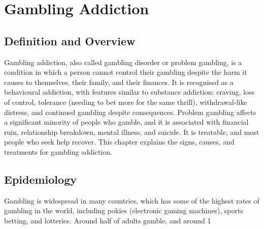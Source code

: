 \chapter{Gambling Addiction}

\section*{Definition and Overview}
Gambling addiction, also called gambling disorder or problem gambling, is a condition in which a person cannot control their gambling despite the harm it causes to themselves, their family, and their finances. It is recognised as a behavioural addiction, with features similar to substance addiction: craving, loss of control, tolerance (needing to bet more for the same thrill), withdrawal-like distress, and continued gambling despite consequences. Problem gambling affects a significant minority of people who gamble, and it is associated with financial ruin, relationship breakdown, mental illness, and suicide. It is treatable, and most people who seek help recover. This chapter explains the signs, causes, and treatments for gambling addiction.

\section*{Epidemiology}
Gambling is widespread in many countries, which has some of the highest rates of gambling in the world, including pokies (electronic gaming machines), sports betting, and lotteries. Around half of adults gamble, and around 1%

